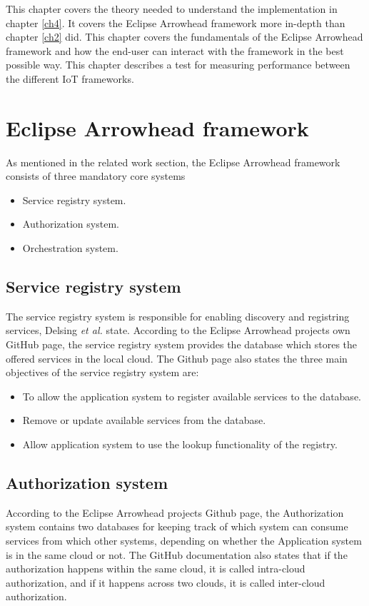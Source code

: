 This chapter covers the theory needed to understand the implementation in chapter \ref{ch4}. 
It covers the Eclipse Arrowhead framework more in-depth than chapter \ref{ch2} did.
This chapter covers the fundamentals of the  Eclipse Arrowhead framework and how the end-user can interact with the framework in the best possible way.
This chapter describes a test for measuring performance between the different IoT frameworks.
\section{Eclipse Arrowhead framework} 
As mentioned in the related work section, the Eclipse Arrowhead framework consists of three mandatory core systems
\begin{itemize}
    \item Service registry system.
    \item Authorization system. 
    \item Orchestration system.
\end{itemize} 
\subsection{Service registry system}
The service registry system is responsible for enabling discovery and registring services, Delsing \textit{et al.} state. 
According to the Eclipse Arrowhead projects own GitHub page, the service registry system provides the database which stores the offered services in the local cloud.\cite{Github2021}
The Github page also states the three main objectives of the service registry system are:
\begin{itemize}
    \item To allow the application system to register available services to the database. 
    \item Remove or update available services from the database.
    \item Allow application system to use the lookup functionality of the registry.
\end{itemize}
\subsection{Authorization system}
According to the Eclipse Arrowhead projects Github page, the Authorization system contains two databases for keeping track of which system can consume services from which other systems, depending on whether the Application system is in the same cloud or not\cite{Github2021}.
The GitHub documentation also states that if the authorization happens within the same cloud, it is called intra-cloud authorization, and if it happens across two clouds, it is called inter-cloud authorization.
